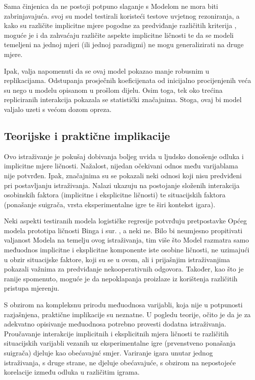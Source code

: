 \documentclass[a4paper, 12pt]{report}
\begin{document}
Sama činjenica da ne postoji potpuno slaganje s Modelom ne mora biti
zabrinjavajuća. \citet{bing2007integrating} svoj su model testirali koristeći
testove uvjetnog rezoniranja, a kako su različite implicitne mjere pogodne za
predviđanje različitih kriterija \citep{uhlmann2012getting}, moguće je i da
zahvaćaju različite aspekte implicitne ličnosti te da se modeli temeljeni na
jednoj mjeri (ili jednoj paradigmi) ne mogu generalizirati na druge mjere.

Ipak, valja napomenuti da se ovaj model pokazao manje robusnim u replikacijama.
Odstupanja prosječnih koeficijenata od inicijalno procijenjenih veća su nego u
modelu opisanom u prošlom dijelu. Osim toga, tek oko trećina repliciranih
interakcija pokazala se statistički značajnima. Stoga, ovaj bi model valjalo
uzeti s većom dozom opreza. 

\subsection{Teorijske i praktične implikacije}

Ovo istraživanje je pokušaj dobivanja boljeg uvida u ljudsko donošenje odluka
i implicitne mjere ličnosti. Nažalost, nijedan očekivani odnos među varijablama
nije potvrđen. Ipak, značajnima su se pokazali neki odnosi koji nisu predviđeni
pri postavljanju istraživanja. Nalazi ukazuju na postojanje složenih interakcija
osobinskih faktora (implicitne i eksplicitne ličnosti) te situacijskih faktora
(ponašanje suigrača, vrsta eksperimentalne igre te širi kontekst igara).

Neki aspekti testiranih modela logističke regresije potvrđuju pretpostavke
Općeg modela prototipa ličnosti Binga i sur. \citeyearpar{bing2007integrating},
a neki ne. Bilo bi neumjesno propitivati valjanost Modela na temelju ovog
istraživanja, tim više što Model razmatra samo međuodnos implicitne i
eksplicitne komponente iste osobine ličnosti, ne uzimajući u obzir situacijske
faktore, koji su se u ovom, ali i prijašnjim istraživanjima
pokazali važnima za predviđanje nekooperativnih odgovora. 
Također, kao što je ranije spomenuto, moguće je da nepoklapanja proizlaze iz
korištenja različitih pristupa mjerenju.

S obzirom na kompleksnu prirodu međuodnosa varijabli, koja nije u potpunosti
razjašnjena, praktične implikacije su neznatne. U pogledu teorije, očito je da
je za adekvatno opisivanje međuodnosa potrebno provesti dodatna istraživanja. 
Proučavanje interakcije implicitnih i eksplicitnih mjera ličnosti te različitih
situacijskih varijabli vezanih uz eksperimentalne igre (prvenstveno ponašanja
suigrača) djeluje kao obećavajuć smjer. Variranje igara unutar jednog
istraživanja, s druge strane, ne djeluje obećavajuće, s obzirom na nepostojeće
korelacije između odluka u različitim igrama.
\end{document}
